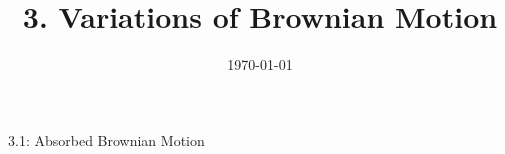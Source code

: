 \documentclass{beamer}
\title{3. Variations of Brownian Motion}
\date{\today}
\begin{document}
	
	\begin{frame}{3.1: Absorbed Brownian Motion}
		
		
	\end{frame}
	
	
\end{document}
